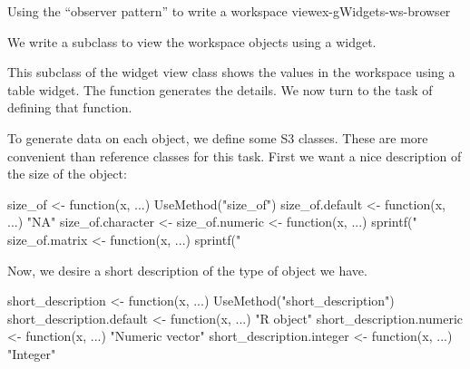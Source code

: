 \begin{example}{Using the ``observer pattern'' to write a workspace view}{ex-gWidgets-ws-browser}
%

We write a  subclass to view the workspace
objects using a  widget.
\begin{Schunk}
\end{Schunk}
%


This subclass of the widget view class shows
the values in the workspace using a table widget. The
 function generates the details. We now turn to
the task of defining that function.

To generate data on each object, we define some S3 classes. These are
more convenient than reference classes for this task. First we want a
nice description of the size of the object:
\begin{Schunk}
\begin{Sinput}
 size_of <- function(x, ...) UseMethod("size_of")
 size_of.default <- function(x, ...) "NA"
 size_of.character <- size_of.numeric <- 
   function(x, ...) sprintf("%
 size_of.matrix <- function(x, ...) 
   sprintf("%
\end{Sinput}
\end{Schunk}

%

Now, we desire a short description of the type of object we have.
\begin{Schunk}
\begin{Sinput}
 short_description <- function(x, ...) 
   UseMethod("short_description")
 short_description.default <- function(x, ...) "R object"
 short_description.numeric <- function(x, ...) "Numeric vector"
 short_description.integer <- function(x, ...) "Integer"
\end{Sinput}
\end{Schunk}
%


\end{example}

